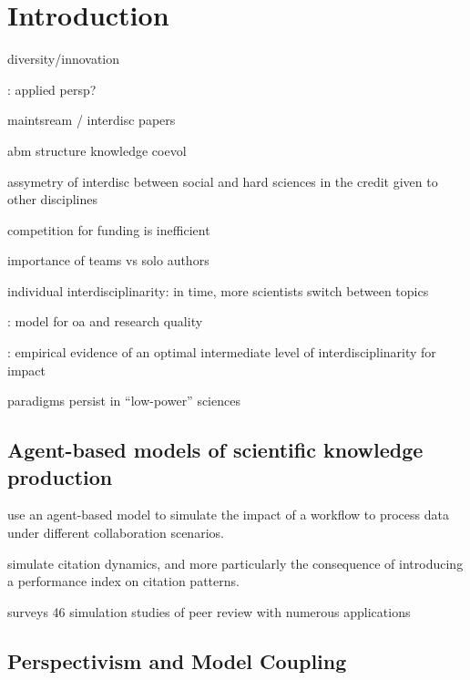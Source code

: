 \documentclass[utf8]{frontiersFPHY} %
\begin{document}
\section{Introduction}


\cite{Hofstra9284} diversity/innovation

\cite{Ellemers7561}: applied persp?

\cite{brown_murray_furlong_coco_dablander_2020}

\cite{2019arXiv191003628T} maintsream / interdisc papers

\cite{jang2019coevolutionary} abm structure knowledge coevol

\cite{urbanska2019does} assymetry of interdisc between social and hard sciences in the credit given to other disciplines

\cite{gross2019contest} competition for funding is inefficient

\cite{pavlidis2014together} importance of teams vs solo authors 

\cite{zeng2019increasing} individual interdisciplinarity: in time, more scientists switch between topics

\cite{VANVLOKHOVEN2019751} : model for oa and research quality


\cite{lariviere2010relationship} : empirical evidence of an optimal intermediate level of interdisciplinarity for impact %


\cite{akerlof2018persistence} paradigms persist in ``low-power'' sciences


\subsection{Agent-based models of scientific knowledge production}

\cite{shafiee2019agent} use an agent-based model to simulate the impact of a workflow to process data under different collaboration scenarios.

\cite{doi10.1162qssa00008} simulate citation dynamics, and more particularly the consequence of introducing a performance index on citation patterns.

\cite{feliciani2019scoping} surveys 46 simulation studies of peer review with numerous applications
\cite{kovanis2016complex}


\subsection{Perspectivism and Model Coupling}
\end{document}
